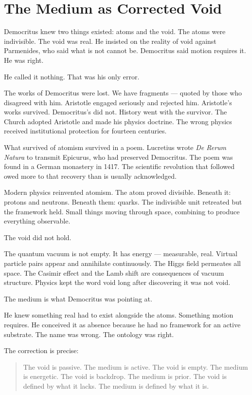 \documentclass[11pt]{article}
\begin{document}
\section{The Medium as Corrected Void}
\label{sec:orga8068fa}

Democritus knew two things existed: atoms and the void. The atoms were
indivisible. The void was real. He insisted on the reality of void against
Parmenides, who said what is not cannot be. Democritus said motion requires it.
He was right.

He called it nothing. That was his only error.

The works of Democritus were lost. We have fragments — quoted by those who
disagreed with him. Aristotle engaged seriously and rejected him. Aristotle's
works survived. Democritus's did not. History went with the survivor. The Church
adopted Aristotle and made his physics doctrine. The wrong physics received
institutional protection for fourteen centuries.

What survived of atomism survived in a poem. Lucretius wrote \emph{De Rerum Natura}
to transmit Epicurus, who had preserved Democritus. The poem was found in a
German monastery in 1417. The scientific revolution that followed owed more to
that recovery than is usually acknowledged.

Modern physics reinvented atomism. The atom proved divisible. Beneath it:
protons and neutrons. Beneath them: quarks. The indivisible unit retreated but
the framework held. Small things moving through space, combining to produce
everything observable.

The void did not hold.

The quantum vacuum is not empty. It has energy — measurable, real. Virtual
particle pairs appear and annihilate continuously. The Higgs field permeates all
space. The Casimir effect and the Lamb shift are consequences of vacuum
structure. Physics kept the word void long after discovering it was not void.

The medium is what Democritus was pointing at.

He knew something real had to exist alongside the atoms. Something motion
requires. He conceived it as absence because he had no framework for an active
substrate. The name was wrong. The ontology was right.

The correction is precise:

\begin{quote}
The void is passive. The medium is active.
The void is empty. The medium is energetic.
The void is backdrop. The medium is prior.
The void is defined by what it lacks. The medium is defined by what it is.
\end{quote}
\end{document}

